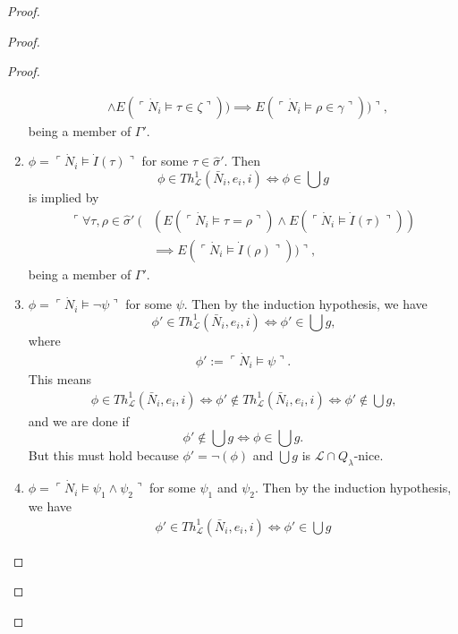 \documentclass[12pt]{article}
\numberwithin{equation}{section}
\begin{document}
\begin{proof}
\begin{proof}
\begin{proof}
\begin{enumerate}[label=Case \arabic*:, leftmargin=50pt]
\begin{align*}
        & \wedge E(\ulcorner \dot{N}_i \models \tau \in \zeta \urcorner)) \implies E(\ulcorner \dot{N}_i \models \rho \in \gamma \urcorner)) \urcorner,
    \end{align*}
    being a member of $\Gamma'$.
    \item $\phi = \ulcorner \dot{N}_i \models \dot{I}(\tau) \urcorner$ for some $\tau \in \hat{\sigma}'$. Then 
    \begin{equation*}
        \phi \in Th^{1}_{\mathcal{L}}(\bar{N}_i, e_i, i) \iff \phi \in \bigcup g
    \end{equation*}
    is implied by  
    \begin{align*}
        \ulcorner \forall \tau, \rho \in \hat{\sigma}' \ ( & (E(\ulcorner \dot{N}_i \models \tau = \rho \urcorner) \wedge E(\ulcorner \dot{N}_i \models \dot{I}(\tau) \urcorner)) \\
        & \implies E(\ulcorner \dot{N}_i \models \dot{I}(\rho) \urcorner)) \urcorner,
    \end{align*}
    being a member of $\Gamma'$.
    \item $\phi = \ulcorner \dot{N}_i \models \neg \psi \urcorner$ for some $\psi$. Then by the induction hypothesis, we have \begin{equation*}
        \phi' \in Th^{1}_{\mathcal{L}}(\bar{N}_i, e_i, i) \iff \phi' \in \bigcup g \text{,} 
    \end{equation*}
    where
    \begin{align*}
        \phi' := \ulcorner \dot{N}_i \models \psi \urcorner \text{.} 
    \end{align*}
    This means  
    \begin{align*}
        \phi \in Th^{1}_{\mathcal{L}}(\bar{N}_i, e_i, i) \iff \phi' \not \in Th^{1}_{\mathcal{L}}(\bar{N}_i, e_i, i) \iff \phi' \not \in \bigcup g \text{,}
    \end{align*}
    and we are done if 
    \begin{equation*}
        \phi' \not \in \bigcup g \iff \phi \in \bigcup g \text{.}
    \end{equation*}
    But this must hold because $\phi' = \neg(\phi)$ and $\bigcup g$ is $\mathcal{L} \cap Q_{\lambda}$-nice. 
    \item $\phi = \ulcorner \dot{N}_i \models \psi_1 \wedge \psi_2 \urcorner$ for some $\psi_1$ and $\psi_2$. Then by the induction hypothesis, we have 
    \begin{align*}
        \phi' \in Th^{1}_{\mathcal{L}}(\bar{N}_i, e_i, i) \iff \phi' \in \bigcup g 
    \end{align*}

\end{enumerate}
\end{proof}
\end{proof}
\end{proof}
\end{document}
